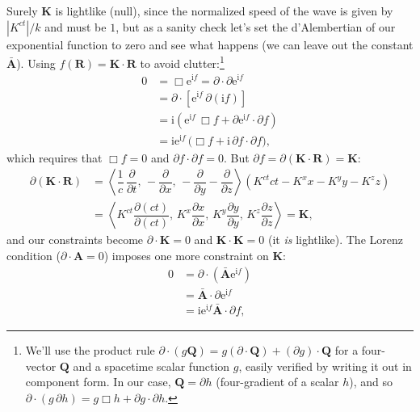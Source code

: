 \documentclass[12pt]{article}
\renewcommand{\vv}[1]{\mathbf{#1}}
\begin{document}
Surely $\vv K$ is lightlike (null), since the normalized speed of the wave is given by $| K^{ct} | / k$ and must be $1$, but as a sanity check let's set the d'Alembertian of our exponential function to zero and see what happens (we can leave out the constant $\bar{\vv A}$). Using $f(\vv R) = \vv K \cdot \vv R$ to avoid clutter:\footnote{We'll use the product rule $\partialup \cdot (g \vv Q) = g (\partialup \cdot \vv Q) + (\partialup g) \cdot \vv Q$ for a four-vector $\vv Q$ and a spacetime scalar function $g$, easily verified by writing it out in component form. In our case, $\vv Q = \partialup h$ (four-gradient of a scalar $h$), and so $\partialup \cdot (g \, \partialup h) = g \Box h + \partialup g \cdot \partialup h$.}
\begin{equation*}
\begin{aligned}
0 &= \Box \mathrm{e}^{\mathrm{i} f} = \partialup \cdot \partialup \mathrm{e}^{\mathrm{i} f} \\
&= \partialup \cdot \left[ \mathrm{e}^{\mathrm{i} f} \, \partialup ( \mathrm{i} f ) \right] \\
&=  \mathrm{i} \left( \mathrm{e}^{\mathrm{i} f} \, \Box f + \partialup \mathrm{e}^{\mathrm{i} f} \cdot \partialup f \right) \\
&=  \mathrm{i} \mathrm{e}^{\mathrm{i} f} \, \big( \Box f + \mathrm{i} \, \partialup f \cdot \partialup f \big),
\end{aligned}
\end{equation*}
which requires that $\Box f = 0$ and $\partialup f \cdot \partialup f = 0$. But $\partialup f = \partialup (\vv K \cdot \vv R) = \vv K$:
\begin{equation*}
\begin{aligned}
\partialup (\vv K \cdot \vv R) &= \left \langle \dfrac{1}{c} \, \dfrac{\partial}{\partial t}, \, - \dfrac{\partial}{\partial x}, \, - \dfrac{\partial}{\partial y} - \dfrac{\partial}{\partial z} \right \rangle \left( K^{ct} ct - K^x x - K^y y - K^z z \right) \\[3pt]
&= \left \langle K^{ct} \dfrac{\partial (ct)}{\partial (ct)}, \, K^x \dfrac{\partial x}{\partial x}, \, K^y \dfrac{\partial y}{\partial y} , \, K^z \dfrac{\partial z}{\partial z} \right \rangle = \vv K ,
\end{aligned}
\end{equation*}
and our constraints become $\partialup \cdot \vv K = 0$ and $\vv K \cdot \vv K = 0$ (it \emph{is} lightlike). The Lorenz condition ($\partialup \cdot \vv A = 0$) imposes one more constraint on $\vv K$:
\begin{equation*}
\begin{aligned}
0 &= \partialup \cdot \left( \bar{\vv A} \mathrm{e}^{\mathrm{i} f} \right) \\
&= \bar{\vv A} \cdot \partialup \mathrm{e}^{\mathrm{i} f} \\
&= \mathrm{i} \mathrm{e}^{\mathrm{i} f} \bar{\vv A} \cdot \partialup f ,
\end{aligned}
\end{equation*}
\end{document}
